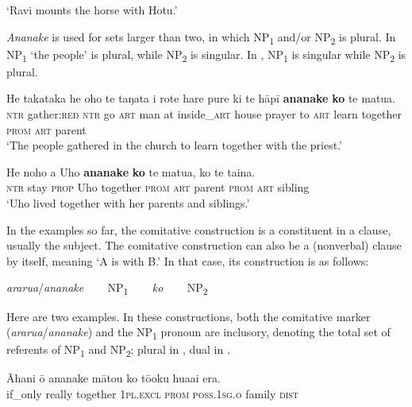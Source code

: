 \glt
‘Ravi mounts the horse with Hotu.’ \textstyleExampleref{[R616.736]} 
\z

\textit{Ananake} is used for sets larger than two, in which NP\textsubscript{1} and/or NP\textsubscript{2} is plural. In  NP\textsubscript{1} ‘the people’ is plural, while NP\textsubscript{2} is singular. In , NP\textsubscript{1} is singular while NP\textsubscript{2} is plural.

\ea\label{ex:8.197}
\gll He takataka he oho te taŋata {\ꞌ}i rote hare pure ki te hāpī \textbf{ananake} \textbf{ko} te matu{\ꞌ}a.\\
\textsc{ntr} gather:\textsc{red} \textsc{ntr} go \textsc{art} man at inside\_\textsc{art} house prayer to \textsc{art} learn together \textsc{prom} \textsc{art} parent\\

\glt 
‘The people gathered in the church to learn together with the priest.’ \textstyleExampleref{[R231.288]} 
\z

\ea\label{ex:8.198}
\gll He noho a Uho \textbf{ananake} \textbf{ko} te matu{\ꞌ}a, ko te taina.\\
\textsc{ntr} stay \textsc{prop} Uho together \textsc{prom} \textsc{art} parent \textsc{prom} \textsc{art} sibling\\

\glt 
‘Uho lived together with her parents and siblings.’ \textstyleExampleref{[Mtx-7-12.055]}
\z

In the examples so far, the comitative construction is a constituent in a clause, usually the subject. The comitative construction can also be a (nonverbal) clause by itself, meaning ‘A is with B.’ In that case, its construction is as follows:

\ea\label{ex:8.198a}
  \textit{ararua}/\textit{ananake} ~~~ NP\textsubscript{1} ~~~ \textit{ko}   ~~~ NP\textsubscript{2}
\z

Here are two examples. In these constructions, both the comitative marker (\textit{ararua}/\textit{ananake}) and the NP\textsubscript{1} pronoun are inclusory, denoting the total set of referents of NP\textsubscript{1} and NP\textsubscript{2}: plural in , dual in .

\ea\label{ex:8.199}
\gll {\ꞌ}Āhani {\ꞌ}ō ananake mātou ko tō{\ꞌ}oku hua{\ꞌ}ai era. \\
if\_only really together \textsc{1pl.excl} \textsc{prom} \textsc{poss.1sg.o} family \textsc{dist} \\

